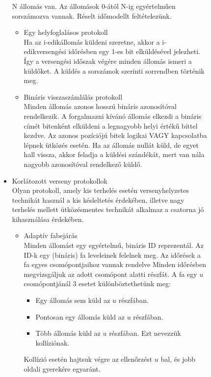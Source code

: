 \documentclass[margin=0px]{article}
\begin{document}
\begin{description}
\begin{description}
\begin{itemize}
                          N állomás van. Az állomások 0-ától N-ig egyértelműen sorszámozva vannak. Réselt időmodellt feltételezünk.
                          \begin{itemize}
                              \item Egy helyfoglalásos protokoll \\
                                    Ha az i-edikállomás küldeni szeretne, akkor a i-edikversengési időrésben egy 1-es bit elküldésével jelezheti. Így a versengési időszak végére minden állomás ismeri a küldőket. A küldés a sorszámok szerinti sorrendben történik meg.
                              \item Bináris visszaszámlálás protokoll \\
                                    Minden állomás azonos hosszú bináris azonosítóval rendelkezik. A forgalmazni kívánó állomás elkezdi a bináris címét bitenként elküldeni a legnagyobb helyi értékű bittel kezdve. Az azonos pozíciójú bitek logikai VAGY kapcsolatba lépnek ütközés esetén. Ha az állomás nullát küld, de egyet hall vissza, akkor feladja a küldési szándékát, mert van nála nagyobb azonosítóval rendelkező küldő.
                          \end{itemize}
                    \item Korlátozott verseny protokollok \\
                          Olyan protokoll, amely kis terhelés esetén versenyhelyzetes technikát használ a kis késleltetés érdekében, illetve nagy terhelés mellett ütközésmentes technikát alkalmaz a csatorna jó kihasználása érdekében.
                          \begin{itemize}
                              \item Adaptív fabejárás \\
                                    Minden állomást egy egyértelmű, bináris ID reprezentál. Az ID-k egy (bináris) fa leveleinek felelnek meg. Az időrések a fa egyes csomópontjaihoz vannak rendelve Minden időrésben megvizsgáljuk az adott csomópont alatti részfát. A fa egy $u$ csomópontjánál 3 esetet
                                    különböztethetünk meg:
                                    \begin{itemize}
                                        \item Egy állomás sem küld az $u$ részfában.
                                        \item Pontosan egy állomás küld az $u$ részfában.
                                        \item Több állomás küld az $u$ részfában. Ezt nevezzük kollíziónak.
                                    \end{itemize}
                                    Kollízió esetén hajtsuk végre az ellenőrzést $u$ bal, és jobb oldali gyerekére egyaránt.


\end{itemize}
\end{itemize}
\end{description}
\end{description}
\end{document}

